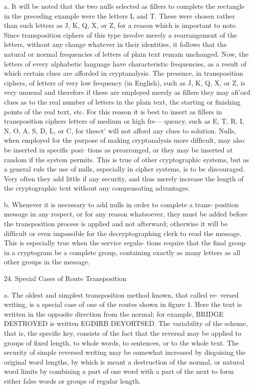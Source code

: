 a. It will be noted that the two nulls selected as ﬁllers to complete the
rectangle in the preceding example were the letters L and T. These were
chosen rather than such letters as J, K, Q, X, or Z, for a reason which
is important to note. Since transposition ciphers of this type involve
merely a rearrangement of the letters, without any change whatever in
their identities, it follows that the natural or normal frequencies of letters
of plain text remain unchanged. Now, the letters of every alphabetic
language have characteristic frequencies, as a result of which certain clues
are afforded in cryptanalysis. The presence, in transposition ciphers, of
letters of very low frequency (in English), such as J, K, Q, X, or Z, is
very unusual and therefore if these are employed merely as ﬁllers they
may aﬁ'ord clues as to the real number of letters in the plain text, the
starting or ﬁnishing points of the real text, etc. For this reason it is best
to insert as ﬁllers in transposition ciphers letters of medium or high fre—
quency, such as E, T, R, I, N, O, A, S, D, L, or C, for thesct' will not
afford any clues to solution. Nulls, when employed for the purpose of
making cryptanalysis more difﬁcult, may also be inserted in speciﬁc posi-
tions as prearranged, or they may be inserted at random if the system
permits. This is true of other cryptographic systems, but as a general
rule the use of nulls, especially in cipher systems, is to be discouraged.
Very often they add little if any security, and thus merely increase the
length of the cryptographic text without any compensating advantages.

b. Whenever it is necessary to add nulls in order to complete a trans-
position message in any respect, or for any reason whatsoever, they must
be added before the transposition process is applied and not afterward;
otherwise it will be difﬁcult or even impossible for the decryptographing
clerk to read the message. This is especially true when the service regula-
tions require that the ﬁnal group in a cryptogram be a complete group,
containing exactly as many letters as all other groups in the message.


24. Special Cases of Route Transposition

a. The oldest and simplest transposition method known, that called re-
versed writing, is a special case of one of the routes shown in ﬁgure 1.
Here the text is written in the opposite direction from the normal; for
example, BRIDGE DESTROYED is written EGDIRB DEYORTSED.
The variability of the scheme, that is, the speciﬁc key, consists of the fact
that the reversal may be applied to groups of ﬁxed length, to whole
words, to sentences, or to the whole text. The security of simple reversed
writing may be somewhat increased by disguising the original word
lengths, by which is meant a destruction of the normal, or natural word
limits by combining a part of one word with a part of the next to form
either false words or groups of regular length.

